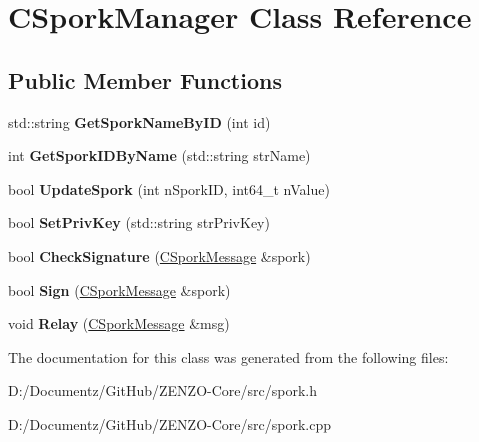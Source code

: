 \hypertarget{class_c_spork_manager}{}\section{C\+Spork\+Manager Class Reference}
\label{class_c_spork_manager}
\subsection*{Public Member Functions}
\begin{DoxyCompactItemize}
\item 
\mbox{\label{class_c_spork_manager_a1a2960fa69bc49f5e4d36db583d4a840}} 
std\+::string {\bfseries Get\+Spork\+Name\+By\+ID} (int id)
\item 
\mbox{\label{class_c_spork_manager_ae72689cf7a2e87ef57f8f7e875a5c21d}} 
int {\bfseries Get\+Spork\+I\+D\+By\+Name} (std\+::string str\+Name)
\item 
\mbox{\label{class_c_spork_manager_afb7e15fe29bd548939657a20ca5feafb}} 
bool {\bfseries Update\+Spork} (int n\+Spork\+ID, int64\+\_\+t n\+Value)
\item 
\mbox{\label{class_c_spork_manager_a599d088218de9d242e4dc5cb17dd310b}} 
bool {\bfseries Set\+Priv\+Key} (std\+::string str\+Priv\+Key)
\item 
\mbox{\label{class_c_spork_manager_a697d8c0ce5c422ea125eee96687aa7b3}} 
bool {\bfseries Check\+Signature} (\mbox{\hyperlink{class_c_spork_message}{C\+Spork\+Message}} \&spork)
\item 
\mbox{\label{class_c_spork_manager_adf1b5d40f378c4bd3a5ea31905b11f30}} 
bool {\bfseries Sign} (\mbox{\hyperlink{class_c_spork_message}{C\+Spork\+Message}} \&spork)
\item 
\mbox{\label{class_c_spork_manager_ae8651894670c02ecb5f99806376d5af2}} 
void {\bfseries Relay} (\mbox{\hyperlink{class_c_spork_message}{C\+Spork\+Message}} \&msg)
\end{DoxyCompactItemize}


The documentation for this class was generated from the following files\+:\begin{DoxyCompactItemize}
\item 
D\+:/\+Documentz/\+Git\+Hub/\+Z\+E\+N\+Z\+O-\/\+Core/src/spork.\+h\item 
D\+:/\+Documentz/\+Git\+Hub/\+Z\+E\+N\+Z\+O-\/\+Core/src/spork.\+cpp\end{DoxyCompactItemize}
